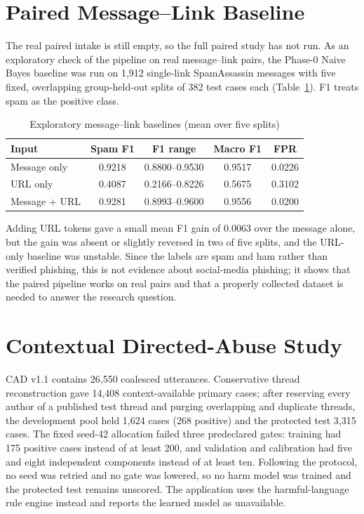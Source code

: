 \section{Paired Message--Link Baseline}
\noindent The real paired intake is still empty, so the full paired study has not run. As an exploratory check of the pipeline on real message--link pairs, the Phase-0 Naive Bayes baseline was run on 1,912 single-link SpamAssassin messages with five fixed, overlapping group-held-out splits of 382 test cases each (Table~\ref{tab:paired}). F1 treats spam as the positive class.

\begin{table}[H]
\centering
\small
\renewcommand{\arraystretch}{1.15}
\caption{Exploratory message--link baselines (mean over five splits)}
\label{tab:paired}
\begin{tabular}{|l|c|c|c|c|}
\hline
\textbf{Input} & \textbf{Spam F1} & \textbf{F1 range} & \textbf{Macro F1} & \textbf{FPR} \\ \hline
Message only & 0.9218 & 0.8800--0.9530 & 0.9517 & 0.0226 \\ \hline
URL only & 0.4087 & 0.2166--0.8226 & 0.5675 & 0.3102 \\ \hline
Message + URL & 0.9281 & 0.8993--0.9600 & 0.9556 & 0.0200 \\ \hline
\end{tabular}
\end{table}



\noindent Adding URL tokens gave a small mean F1 gain of 0.0063 over the message alone, but the gain was absent or slightly reversed in two of five splits, and the URL-only baseline was unstable. Since the labels are spam and ham rather than verified phishing, this is not evidence about social-media phishing; it shows that the paired pipeline works on real pairs and that a properly collected dataset is needed to answer the research question.

\section{Contextual Directed-Abuse Study}\label{sec:cadres}
\noindent CAD v1.1 contains 26,550 coalesced utterances. Conservative thread reconstruction gave 14,408 context-available primary cases; after reserving every author of a published test thread and purging overlapping and duplicate threads, the development pool held 1,624 cases (268 positive) and the protected test 3,315 cases. The fixed seed-42 allocation failed three predeclared gates: training had 175 positive cases instead of at least 200, and validation and calibration had five and eight independent components instead of at least ten. Following the protocol, no seed was retried and no gate was lowered, so no harm model was trained and the protected test remains unscored. The application uses the harmful-language rule engine instead and reports the learned model as unavailable.



